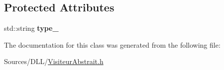 \subsection*{Protected Attributes}
\begin{DoxyCompactItemize}
\item 
std\+::string {\bfseries type\+\_\+}
\end{DoxyCompactItemize}


The documentation for this class was generated from the following file\+:\begin{DoxyCompactItemize}
\item 
Sources/\+D\+L\+L/\hyperlink{_visiteur_abstrait_8h}{Visiteur\+Abstrait.\+h}\end{DoxyCompactItemize}
